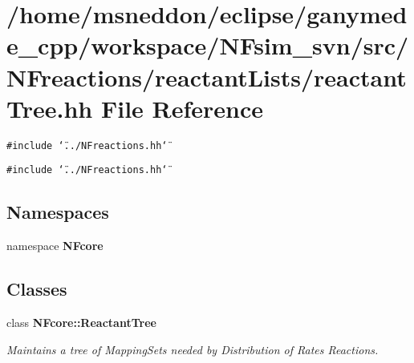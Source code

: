 \section{/home/msneddon/eclipse/ganymede\_\-cpp/workspace/NFsim\_\-svn/src/NFreactions/reactantLists/reactantTree.hh File Reference}
\label{reactantTree_8hh}


{\tt \#include \char`\"{}../NFreactions.hh\char`\"{}}\par
{\tt \#include \char`\"{}../NFreactions.hh\char`\"{}}\par
\subsection*{Namespaces}
\begin{CompactItemize}
\item 
namespace {\bf NFcore}
\end{CompactItemize}
\subsection*{Classes}
\begin{CompactItemize}
\item 
class {\bf NFcore::ReactantTree}
\begin{CompactList}\small\item\em Maintains a tree of MappingSets needed by Distribution of Rates Reactions. \item\end{CompactList}\end{CompactItemize}
